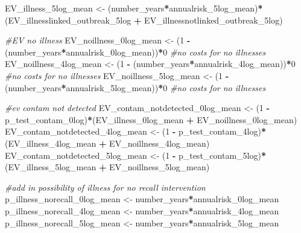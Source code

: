 \documentclass[
]{article}
\newenvironment{Shaded}{\begin{snugshade}}{\end{snugshade}}
\newcommand{\CommentTok}[1]{\textcolor[rgb]{0.56,0.35,0.01}{\textit{#1}}}
\newcommand{\DecValTok}[1]{\textcolor[rgb]{0.00,0.00,0.81}{#1}}
\newcommand{\NormalTok}[1]{#1}
\newcommand{\OtherTok}[1]{\textcolor[rgb]{0.56,0.35,0.01}{#1}}
\newcommand{\SpecialCharTok}[1]{\textcolor[rgb]{0.81,0.36,0.00}{\textbf{#1}}}
\begin{document}
\begin{Shaded}
\begin{Highlighting}[]
\NormalTok{EV\_illness\_5log\_mean }\OtherTok{\textless{}{-}}\NormalTok{ (number\_years}\SpecialCharTok{*}\NormalTok{annualrisk\_5log\_mean)}\SpecialCharTok{*}\NormalTok{(EV\_illnesslinked\_outbreak\_5log }\SpecialCharTok{+}\NormalTok{ EV\_illnessnotlinked\_outbreak\_5log)}


\CommentTok{\#EV no illness}
\NormalTok{EV\_noillness\_0log\_mean }\OtherTok{\textless{}{-}}\NormalTok{ (}\DecValTok{1} \SpecialCharTok{{-}}\NormalTok{ (number\_years}\SpecialCharTok{*}\NormalTok{annualrisk\_0log\_mean))}\SpecialCharTok{*}\DecValTok{0} \CommentTok{\#no costs for no illnesses}
\NormalTok{EV\_noillness\_4log\_mean }\OtherTok{\textless{}{-}}\NormalTok{ (}\DecValTok{1} \SpecialCharTok{{-}}\NormalTok{ (number\_years}\SpecialCharTok{*}\NormalTok{annualrisk\_4log\_mean))}\SpecialCharTok{*}\DecValTok{0} \CommentTok{\#no costs for no illnesses}
\NormalTok{EV\_noillness\_5log\_mean }\OtherTok{\textless{}{-}}\NormalTok{ (}\DecValTok{1} \SpecialCharTok{{-}}\NormalTok{ (number\_years}\SpecialCharTok{*}\NormalTok{annualrisk\_5log\_mean))}\SpecialCharTok{*}\DecValTok{0} \CommentTok{\#no costs for no illnesses}


\CommentTok{\#ev contam not detected}
\NormalTok{EV\_contam\_notdetected\_0log\_mean }\OtherTok{\textless{}{-}}\NormalTok{ (}\DecValTok{1} \SpecialCharTok{{-}}\NormalTok{ p\_test\_contam\_0log)}\SpecialCharTok{*}\NormalTok{(EV\_illness\_0log\_mean }\SpecialCharTok{+}\NormalTok{ EV\_noillness\_0log\_mean)}
\NormalTok{EV\_contam\_notdetected\_4log\_mean }\OtherTok{\textless{}{-}}\NormalTok{ (}\DecValTok{1} \SpecialCharTok{{-}}\NormalTok{ p\_test\_contam\_4log)}\SpecialCharTok{*}\NormalTok{(EV\_illness\_4log\_mean }\SpecialCharTok{+}\NormalTok{ EV\_noillness\_4log\_mean)}
\NormalTok{EV\_contam\_notdetected\_5log\_mean }\OtherTok{\textless{}{-}}\NormalTok{ (}\DecValTok{1} \SpecialCharTok{{-}}\NormalTok{ p\_test\_contam\_5log)}\SpecialCharTok{*}\NormalTok{(EV\_illness\_5log\_mean }\SpecialCharTok{+}\NormalTok{ EV\_noillness\_5log\_mean)}

\CommentTok{\#add in possibility of illness for no recall intervention}
\NormalTok{p\_illness\_norecall\_0log\_mean }\OtherTok{\textless{}{-}}\NormalTok{ number\_years}\SpecialCharTok{*}\NormalTok{annualrisk\_0log\_mean}
\NormalTok{p\_illness\_norecall\_4log\_mean }\OtherTok{\textless{}{-}}\NormalTok{ number\_years}\SpecialCharTok{*}\NormalTok{annualrisk\_4log\_mean }
\NormalTok{p\_illness\_norecall\_5log\_mean }\OtherTok{\textless{}{-}}\NormalTok{ number\_years}\SpecialCharTok{*}\NormalTok{annualrisk\_5log\_mean }



\end{Highlighting}
\end{Shaded}
\end{document}
